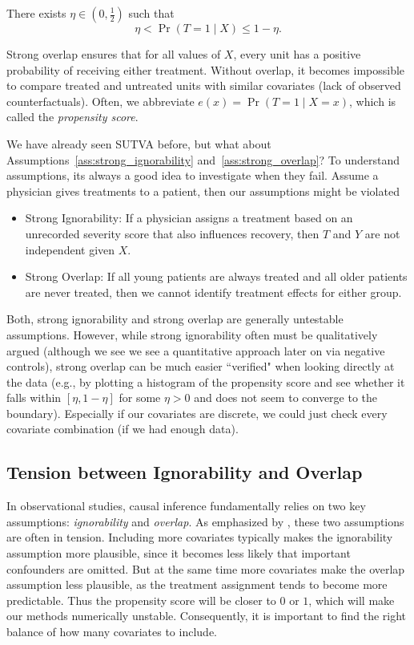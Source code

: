 \documentclass[11pt]{exam}
\begin{document}
\begin{assumption}\label{ass:strong_overlap}
    There exists $\eta \in (0, \frac{1}{2})$ such that
    \[
    \eta < \Pr(T = 1 \mid X) \leq 1 - \eta.
    \]
    \noindent 
\end{assumption}
Strong overlap ensures that for all values of $X$, every unit has a positive probability of receiving either treatment. Without overlap, it becomes impossible to compare treated and untreated units with similar covariates (lack of observed counterfactuals). Often, we abbreviate $e(x) = \Pr(T = 1\mid X = x)$, which is called the \emph{propensity score}.

We have already seen SUTVA before, but what about Assumptions~\ref{ass:strong_ignorability} and~\ref{ass:strong_overlap}? To understand assumptions, its always a good idea to investigate when they fail. Assume a physician gives treatments to a patient, then our assumptions might be violated
\begin{itemize}
    \item Strong Ignorability: If a physician assigns a treatment based on an unrecorded severity score that also influences recovery, then $T$ and $Y$ are not independent given $X$.
    \item Strong Overlap: If all young patients are always treated and all older patients are never treated, then we cannot identify treatment effects for either group.
\end{itemize}

Both, strong ignorability and strong overlap are generally untestable assumptions. However, while strong ignorability often must be qualitatively argued (although we see we see a quantitative approach later on via negative controls), strong overlap can be much easier ``verified" when looking directly at the data (e.g., by plotting a histogram of the propensity score and see whether it falls within $[\eta, 1 - \eta]$ for some $\eta > 0$ and does not seem to converge to the boundary). Especially if our covariates are discrete, we could just check every covariate combination (if we had enough data).


\subsection{Tension between Ignorability and Overlap}
In observational studies, causal inference fundamentally relies on two key assumptions: \emph{ignorability} and \emph{overlap}. 
As emphasized by \citet{d2021overlap}, these two assumptions are often in tension. 
Including more covariates typically makes the ignorability assumption more plausible, since it becomes less likely that important confounders are omitted. But at the same time more covariates make the overlap assumption less plausible, as the treatment assignment tends to become more predictable. Thus the propensity score will be closer to $0$ or $1$, which will make our methods numerically unstable. Consequently, it is important to find the right balance of how many covariates to include.
\end{document}
